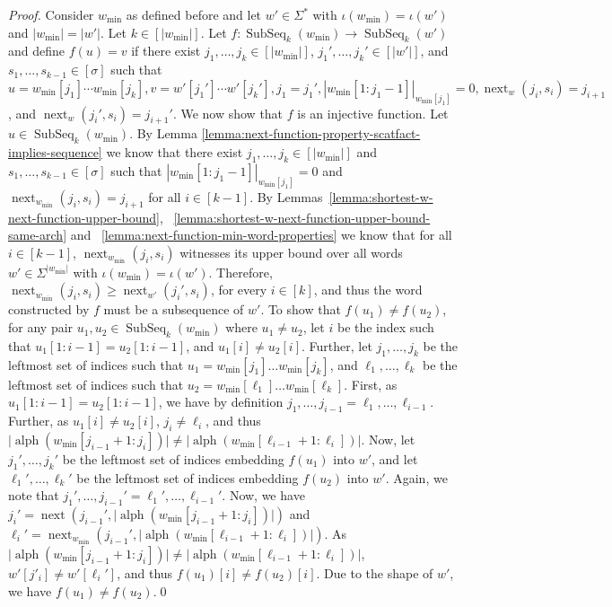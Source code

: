 \documentclass[runningheads,UKenglish,cleveref, autoref, thm-restate]{llncs}
\DeclareMathOperator{\alphabet}{alph}
\DeclareMathOperator\ScatFact{SubSeq}
\DeclareMathOperator{\nextAlphPos}{next}
\begin{document}
\begin{proof}
	Consider $w_{\min}$ as defined before and let $w'\in\Sigma^*$ with $\iota(w_{\min}) = \iota(w')$
	and $|w_{\min}| = |w'|$. Let $k\in[|w_{\min}|]$.
	Let $f : \ScatFact_k(w_{\min}) \rightarrow \ScatFact_k(w')$ and define $f(u) = v$
	if there exist $j_1,\ldots,j_k\in[|w_{\min}|]$, $j_1',\ldots,j_k'\in[|w'|]$, and $s_1,\ldots,s_{k-1}\in[\sigma]$ such that $u = w_{\min}[j_1]\cdots w_{\min}[j_k], v = w'[j_1'] \cdots w'[j_k'], j_1 = j_1',|w_{\min}[1:j_1-1]|_{w_{\min}[j_1]} = 0, \nextAlphPos_w(j_i,s_i) = j_{i+1}$, and $\nextAlphPos_w(j_i',s_i) = j_{i+1}'$.
	We now show that $f$ is an injective function.
	Let $u\in\ScatFact_k(w_{\min})$.
	By Lemma \ref{lemma:next-function-property-scatfact-implies-sequence} we know that there exist $j_1,\ldots,j_k\in[|w_{\min}|]$ and
	$s_1,\ldots,s_{k-1}\in[\sigma]$ such that $|w_{\min}[1:j_1-1]|_{w_{\min}[j_1]} = 0$ and $\nextAlphPos_{w_{\min}}(j_i,s_i) = j_{i+1}$
	for all $i\in[k-1]$.
	By Lemmas~\ref{lemma:shortest-w-next-function-upper-bound}, ~\ref{lemma:shortest-w-next-function-upper-bound-same-arch}
	and ~\ref{lemma:next-function-min-word-properties} we know that for all $i\in[k-1]$, $\nextAlphPos_{w_{\min}}(j_i,s_i)$
	witnesses its upper bound over all words $w'\in\Sigma^{\vert w_{\min} \vert}$ with $\iota(w_{\min}) = \iota(w')$. Therefore, $\nextAlphPos_{w_{\min}}(j_i,s_i) \geq \nextAlphPos_{w'}(j_i',s_i)$, for every $i \in [k]$, and thus the word constructed by $f$ must be a subsequence of $w'$. To show that $f(u_1) \neq f(u_2)$, for any pair $u_1, u_2 \in \ScatFact_k(w_{\min})$ where $u_1 \neq u_2$, let $i$ be the index such that $u_1[1: i - 1] = u_2[1 : i - 1]$, and $u_1[i] \neq u_2[i]$. Further, let $j_1, \dots, j_k$ be the leftmost set of indices such that $u_1 = w_{\min}[j_1] \dots w_{\min}[j_k]$, and $\ell_1, \dots, \ell_k$ be the leftmost set of indices such that $u_2 = w_{\min}[\ell_1] \dots w_{\min}[\ell_k]$. First, as $u_1[1:i - 1] = u_2[1:i - 1]$, we have by definition $j_1, \dots, j_{i - 1} = \ell_1, \dots, \ell_{i - 1}$. Further, as $u_1[i] \neq u_2[i]$, $j_i \neq \ell_i$, and thus $\vert \alphabet(w_{\min}[j_{i - 1} + 1 : j_{i}]) \vert \neq \vert \alphabet(w_{\min}[\ell_{i - 1} + 1 : \ell_i]) \vert$. Now, let $j_1', \dots, j_k'$ be the leftmost set of indices embedding $f(u_1)$ into $w'$, and let $\ell_1', \dots, \ell_k'$ be the leftmost set of indices embedding $f(u_2)$ into $w'$. Again, we note that $j_1', \dots, j_{i - 1}' = \ell_1', \dots, \ell_{i - 1}'$. Now, we have $j_i' = \nextAlphPos(j_{i - 1}', \vert \alphabet(w_{\min}[j_{i - 1} + 1 : j_{i}]) \vert)$ and $\ell_i' =  \nextAlphPos_{w_{\min}}(j_{i - 1}', \vert \alphabet(w_{\min}[\ell_{i - 1} + 1 : \ell_i]) \vert)$. As $\vert \alphabet(w_{\min}[j_{i - 1} + 1 : j_{i}]) \vert \neq \vert \alphabet(w_{\min}[\ell_{i - 1} + 1 : \ell_i]) \vert$, $w'[j'_i] \neq w'[\ell_i']$, and thus $f(u_1)[i] \neq f(u_2)[i]$. Due to the shape of $w'$, we have $f(u_1) \neq f(u_2)$.\qed

\end{proof}
\end{document}

